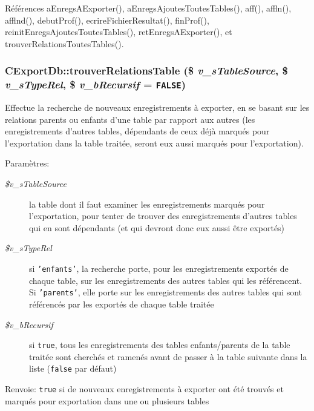 Références aEnregsAExporter(), aEnregsAjoutesToutesTables(), aff(), affln(), afflnd(), debutProf(), ecrireFichierResultat(), finProf(), reinitEnregsAjoutesToutesTables(), retEnregsAExporter(), et trouverRelationsToutesTables().
\subsubsection{\setlength{\rightskip}{0pt plus 5cm}CExportDb::trouverRelationsTable (\$ {\em v\_\-sTableSource}, \/  \$ {\em v\_\-sTypeRel}, \/  \$ {\em v\_\-bRecursif} = {\tt FALSE})}\label{class_c_export_db_9da3b281b2618998f5f7197334a0c5dc}


Effectue la recherche de nouveaux enregistrements à exporter, en se basant sur les relations parents ou enfants d'une table par rapport aux autres (les enregistrements d'autres tables, dépendants de ceux déjà marqués pour l'exportation dans la table traitée, seront eux aussi marqués pour l'exportation). 

\begin{Desc}
\item[Paramètres:]
\begin{description}
\item[{\em \$v\_\-sTableSource}]la table dont il faut examiner les enregistrements marqués pour l'exportation, pour tenter de trouver des enregistrements d'autres tables qui en sont dépendants (et qui devront donc eux aussi être exportés) \item[{\em \$v\_\-sTypeRel}]si {\tt 'enfants'}, la recherche porte, pour les enregistrements exportés de chaque table, sur les enregistrements des autres tables qui les référencent. Si {\tt 'parents'}, elle porte sur les enregistrements des autres tables qui sont référencés par les exportés de chaque table traitée \item[{\em \$v\_\-bRecursif}]si {\tt true}, tous les enregistrements des tables enfants/parents de la table traitée sont cherchés et ramenés avant de passer à la table suivante dans la liste ({\tt false} par défaut)\end{description}
\end{Desc}
\begin{Desc}
\item[Renvoie:]{\tt true} si de nouveaux enregistrements à exporter ont été trouvés et marqués pour exportation dans une ou plusieurs tables \end{Desc}


